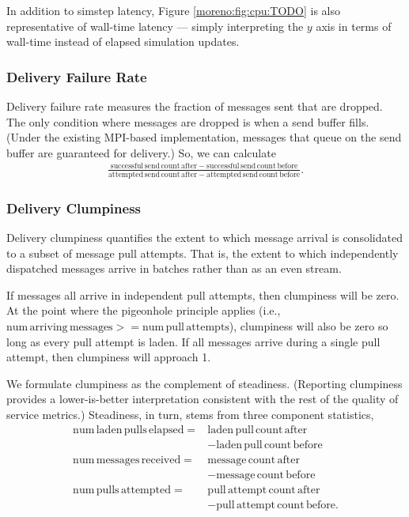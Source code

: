 In addition to simstep latency, Figure \ref{moreno:fig:cpu:TODO} is also representative of wall-time latency --- simply interpreting the $y$ axis in terms of wall-time instead of elapsed simulation updates.

\subsubsection{Delivery Failure Rate} \label{moreno:sec:delivery-failure-rate-metric}

Delivery failure rate measures the fraction of messages sent that are dropped.
The only condition where messages are dropped is when a send buffer fills.
(Under the existing MPI-based implementation, messages that queue on the send buffer are guaranteed for delivery.)
So, we can calculate
\begin{align*}
  \frac{
    \mathrm{successful\,send\,count\,after} - \mathrm{successful\,send\,count\,before}
  }{
    \mathrm{attempted\,send\,count\,after} - \mathrm{attempted\,send\,count\,before}
  }.
\end{align*}

\subsubsection{Delivery Clumpiness} \label{moreno:sec:delivery-clumpiness-metric}

Delivery clumpiness quantifies the extent to which message arrival is consolidated to a subset of message pull attempts.
That is, the extent to which independently dispatched messages arrive in batches rather than as an even stream.

If messages all arrive in independent pull attempts, then clumpiness will be zero.
At the point where the pigeonhole principle applies (i.e., $\mathrm{num\,arriving\,messages} >= \mathrm{num\,pull\,attempts}$), clumpiness will also be zero so long as every pull attempt is laden.
If all messages arrive during a single pull attempt, then clumpiness will approach 1.

We formulate clumpiness as the complement of steadiness.
(Reporting clumpiness provides a lower-is-better interpretation consistent with the rest of the quality of service metrics.)
Steadiness, in turn, stems from three component statistics,
\begin{align*}
\mathrm{num\,laden\,pulls\,elapsed} =& \mathrm{laden\,pull\,count\,after} \\
  &- \mathrm{laden\,pull\,count\,before} \\
\mathrm{num\,messages\,received} =& \mathrm{message\,count\,after} \\
  &- \mathrm{message\,count\,before} \\
\mathrm{num\,pulls\,attempted} =& \mathrm{pull\,attempt\,count\,after} \\
  &- \mathrm{pull\,attempt\,count\,before}
.
\end{align*}

